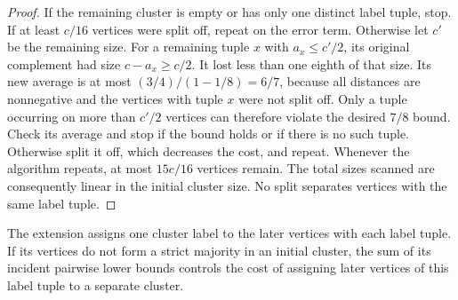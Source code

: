 \documentclass[11pt]{article}
\begin{document}
\begin{proof}
If the remaining cluster is empty or has only one distinct label tuple, stop. If at least
$c/16$ vertices were split off, repeat on the error term. Otherwise let
$c'$ be the remaining size. For a remaining tuple $x$ with $a_x\le c'/2$,
its original complement had size $c-a_x\ge c/2$. It lost less than
one eighth of that size. Its new average is at most
$(3/4)/(1-1/8)=6/7$, because all distances are nonnegative and the
vertices with tuple $x$ were not split off. Only a tuple occurring on more than $c'/2$ vertices
can therefore violate the desired $7/8$ bound. Check its average
and stop if the bound holds or if there is no such tuple. Otherwise
split it off, which decreases the cost, and repeat. Whenever the
algorithm repeats, at most $15c/16$ vertices remain. The total sizes
scanned are consequently linear in the initial cluster size. No
split separates vertices with the same label tuple.
\end{proof}

The extension assigns one cluster label to the later vertices with each
label tuple. If its
vertices do not form a strict majority in an initial cluster, the
sum of its incident pairwise lower bounds controls the cost of assigning
later vertices of this label tuple to a separate cluster.
\end{document}
